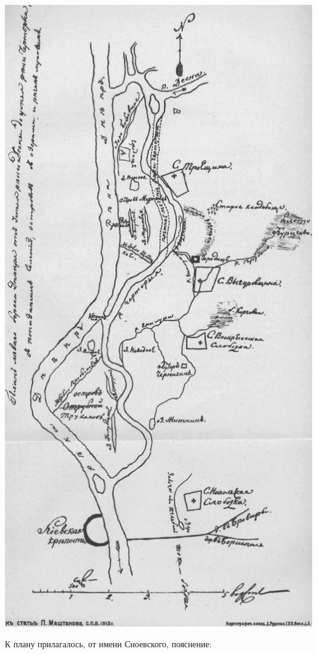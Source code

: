 \begin{center}
\includegraphics[width=0.82\linewidth]{chast-gorodki/snoev/356a.pdf}
\end{center}

\newpage

К плану прилагалось, от имени Сноевского, пояснение:
 
